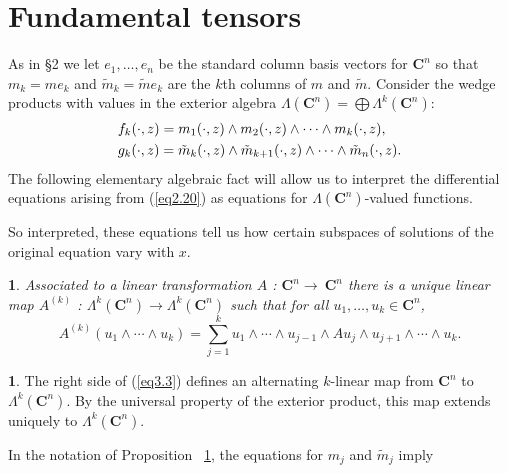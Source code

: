 \documentclass{surv-l}
\theoremstyle{plain}
\newtheorem{prop}[theorem]{\sc{Proposition}}
\theoremstyle{definition}
\newtheorem*{pf}{\sc{Proof}}
\numberwithin{equation}{chapter}
\begin{document}
\section{Fundamental tensors}\label{sec3}
As in \S 2 we let $e_{1},\ldots,e_{n}$ be the standard column basis vectors for $\mathbf{C}^{n}$ so that $m_{k}=me_{k}$ and $\tilde{m}_{k}=\tilde{m}e_{k}$ are the $k$th columns of $m$ and $\tilde{m}.$ Consider the wedge products with values in the exterior algebra  $\Lambda(\mathbf{C}^{n})=\bigoplus\Lambda^{k}(\mathbf{C}^{n})$:
\setcounter{equation}{0}
\begin{align}\label{eq3.1}
&f_{k}(\cdot, z)=m_{1}(\cdot,z)\wedge m_{2}(\cdot, z)\wedge\cdots \wedge m_{k}(\cdot,z),\\ \notag
&g_{k}(\cdot,z)=\tilde{m}_{k}(\cdot, z)\wedge\tilde{m}_{k+1}(\cdot,z)\wedge\cdots \wedge\tilde{m}_{n}(\cdot,z).
\end{align}
The following elementary algebraic fact will allow us to interpret the differential equations arising from (\ref{eq2.20}) as equations for $\Lambda(\mathbf{C}^{n})$-valued functions.

So interpreted, these equations tell us how certain subspaces of solutions of the original equation vary with $x$.
\setcounter{theorem}{1}
\begin{prop}\label{chap01:prop3.2} Associated to a linear transformation $A$ : $ \mathbf{C}^{n}\rightarrow\ \mathbf{C}^{n}$ there is a unique linear map $A^{(k)}$ : $\Lambda^{k}(\mathbf{C}^{n})\rightarrow\Lambda^{k}(\mathbf{C}^{n})$ such that for all $ u_{1},\ldots, u_{k} \in \mathbf{C}^{n}$,
\setcounter{equation}{2}
\begin{equation}\label{eq3.3}
A^{(k)}(u_{1}\wedge\cdots \wedge u_{k})=\sum_{j=1}^{k}u_{1}\wedge\cdots \wedge u_{j-1}\wedge Au_{j}\wedge u_{j+1}\wedge\cdots \wedge u_{k}.
\end{equation}
\end{prop}

\begin{pf} The right side of (\ref{eq3.3}) defines an alternating $k$-linear map from $\mathbf{C}^{n}$ to $\Lambda^{k}(\mathbf{C}^{n})$. By the universal property of the exterior product, this map extends uniquely to $\Lambda^{k}(\mathbf{C}^{n})$.
\end{pf}

In the notation of Proposition ~\ref{chap01:prop3.2}, the equations for $m_{j}$ and $\tilde{m}_{j}$ imply
\end{document}
